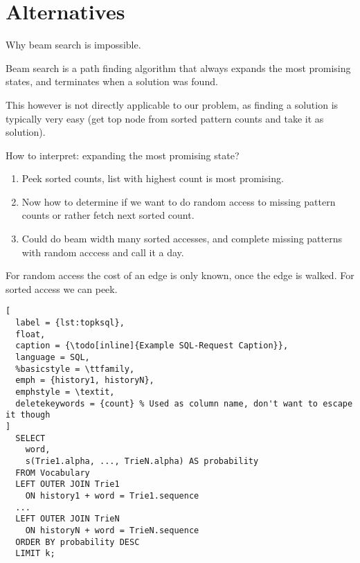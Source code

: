\section{Alternatives}

\begin{draft}
Why beam search is impossible.

Beam search is a path finding algorithm that always expands the most promising
states, and terminates when a solution was found.

This however is not directly applicable to our problem, as finding a solution
is typically very easy (get top node from sorted pattern counts and take it as
solution).

How to interpret: expanding the most promising state?
\begin{enumerate}
  \item Peek sorted counts, list with highest count is most promising.
  \item Now how to determine if we want to do random access to missing pattern
    counts or rather fetch next sorted count.
  \item Could do beam width many sorted accesses, and complete missing patterns
    with random acccess and call it a day.
\end{enumerate}

For random access the cost of an edge is only known, once the edge is walked.
For sorted access we can peek.
\end{draft}

\begin{lstlisting}[
  label = {lst:topksql},
  float,
  caption = {\todo[inline]{Example SQL-Request Caption}},
  language = SQL,
  %basicstyle = \ttfamily,
  emph = {history1, historyN},
  emphstyle = \textit,
  deletekeywords = {count} % Used as column name, don't want to escape it though
]
  SELECT
    word,
    s(Trie1.alpha, ..., TrieN.alpha) AS probability
  FROM Vocabulary
  LEFT OUTER JOIN Trie1
    ON history1 + word = Trie1.sequence
  ...
  LEFT OUTER JOIN TrieN
    ON historyN + word = TrieN.sequence
  ORDER BY probability DESC
  LIMIT k;
\end{lstlisting}
